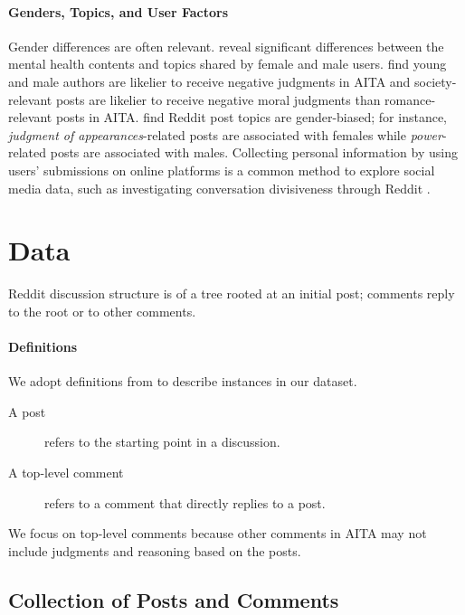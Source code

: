 \documentclass[letterpaper]{article} %
\begin{document}
\paragraph{Genders, Topics, and User Factors}

Gender differences are often relevant.
\citet{choud-2017-mental} reveal significant differences between the mental health contents and topics shared by female and male users.
\citet{candia-2022-demo} find young and male authors are likelier to receive negative judgments in AITA and society-relevant posts are likelier to receive negative moral judgments than romance-relevant posts in AITA.
\citet{ferrer-2021-biasreddit} find Reddit post topics are gender-biased; for instance, \textsl{judgment of appearances}-related posts are associated with females while \textsl{power}-related posts are associated with males.
Collecting personal information by using users' submissions on online platforms is a common method to explore social media data, such as investigating conversation divisiveness through Reddit \cite{beel-2022-linguistic}.

\section{Data}
\label{sec:data}

Reddit discussion structure is of a tree rooted at an initial post; comments reply to the root or to other comments.
\paragraph{Definitions}
We adopt definitions from \citet{guimaraes-2021-xpost} to describe instances in our dataset.
\begin{description}
    \item[A post] refers to the starting point in a discussion.
    \item[A top-level comment] refers to a comment that directly replies to a post.
\end{description}
We focus on top-level comments because other comments in AITA may not include judgments and reasoning based on the posts.

\subsection{Collection of Posts and Comments}
\end{document}
